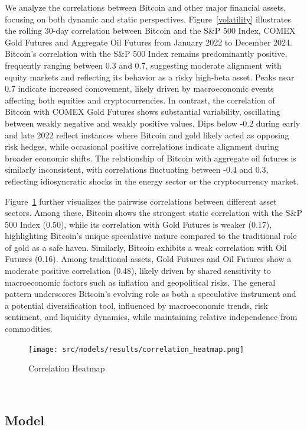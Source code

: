 \documentclass{article}
\begin{document}
We analyze the correlations between Bitcoin and other major financial assets, focusing on both dynamic and static perspectives. Figure~\ref{volatility} illustrates the rolling 30-day correlation between Bitcoin and the S\&P 500 Index, COMEX Gold Futures and Aggregate Oil Futures from January 2022 to December 2024. Bitcoin’s correlation with the S\&P 500 Index remains predominantly positive, frequently ranging between 0.3 and 0.7, suggesting moderate alignment with equity markets and reflecting its behavior as a risky high-beta asset. Peaks near 0.7 indicate increased comovement, likely driven by macroeconomic events affecting both equities and cryptocurrencies. In contrast, the correlation of Bitcoin with COMEX Gold Futures shows substantial variability, oscillating between weakly negative and weakly positive values. Dips below -0.2 during early and late 2022 reflect instances where Bitcoin and gold likely acted as opposing risk hedges, while occasional positive correlations indicate alignment during broader economic shifts. The relationship of Bitcoin with aggregate oil futures is similarly inconsistent, with correlations fluctuating between -0.4 and 0.3, reflecting idiosyncratic shocks in the energy sector or the cryptocurrency market.

Figure~\ref{heat} further visualizes the pairwise correlations between different asset sectors. Among these, Bitcoin shows the strongest static correlation with the S\&P 500 Index (0.50), while its correlation with Gold Futures is weaker (0.17), highlighting Bitcoin’s unique speculative nature compared to the traditional role of gold as a safe haven. Similarly, Bitcoin exhibits a weak correlation with Oil Futures (0.16). Among traditional assets, Gold Futures and Oil Futures show a moderate positive correlation (0.48), likely driven by shared sensitivity to macroeconomic factors such as inflation and geopolitical risks. The general pattern underscores Bitcoin’s evolving role as both a speculative instrument and a potential diversification tool, influenced by macroeconomic trends, risk sentiment, and liquidity dynamics, while maintaining relative independence from commodities.

\begin{figure}[H]
    \centering
    \texttt{[image: src/models/results/correlation\_heatmap.png]}
    \caption{Correlation Heatmap}
    \label{heat}
    
\end{figure}
\

\subsection{Model}
\end{document}
